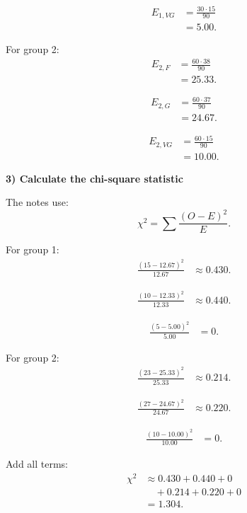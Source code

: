 \documentclass[10pt]{article}
\begin{document}
\begin{align*}
E_{1,VG}
&=
\frac{30\cdot 15}{90}
\\[2mm]
&=5.00.
\end{align*}

For group 2:
\begin{align*}
E_{2,F}
&=
\frac{60\cdot 38}{90}
\\[2mm]
&=25.33.
\end{align*}

\begin{align*}
E_{2,G}
&=
\frac{60\cdot 37}{90}
\\[2mm]
&=24.67.
\end{align*}

\begin{align*}
E_{2,VG}
&=
\frac{60\cdot 15}{90}
\\[2mm]
&=10.00.
\end{align*}

\textbf{3) Calculate the chi-square statistic}

The notes use:
\[
\chi^2
=
\sum
\frac{(O-E)^2}{E}.
\]

For group 1:
\begin{align*}
\frac{(15-12.67)^2}{12.67}
&\approx 0.430.
\end{align*}

\begin{align*}
\frac{(10-12.33)^2}{12.33}
&\approx 0.440.
\end{align*}

\begin{align*}
\frac{(5-5.00)^2}{5.00}
&=0.
\end{align*}

For group 2:
\begin{align*}
\frac{(23-25.33)^2}{25.33}
&\approx 0.214.
\end{align*}

\begin{align*}
\frac{(27-24.67)^2}{24.67}
&\approx 0.220.
\end{align*}

\begin{align*}
\frac{(10-10.00)^2}{10.00}
&=0.
\end{align*}

Add all terms:
\begin{align*}
\chi^2
&\approx
0.430+0.440+0
\\
&\quad
+0.214+0.220+0
\\[2mm]
&=
1.304.
\end{align*}
\end{document}
